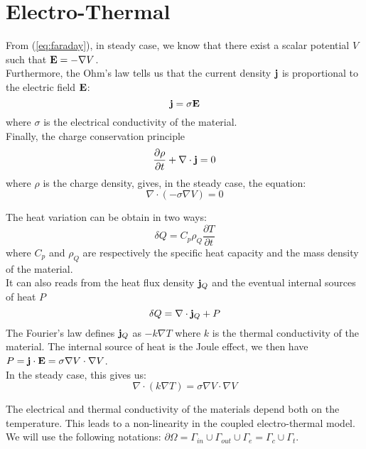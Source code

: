 \section{Electro-Thermal}
From (\ref{eq:faraday}), in steady case, we know that there exist a scalar
potential $V$ such that $\mathbf{E} = -\nabla V$.\\
Furthermore, the Ohm's law tells us that the current density $\mathbf{j}$ is
proportional to the electric field $\mathbf{E}$:
\begin{equation*}
  \mathbf{j} = \sigma\mathbf{E}
\end{equation*}
where $\sigma$ is the electrical conductivity of the material.\\
Finally, the charge conservation principle
\begin{equation*}
  \frac{\partial\rho}{\partial t} + \nabla\cdot\mathbf{j} = 0
\end{equation*}
where $\rho$ is the charge density, gives, in the steady case, the equation:
\begin{equation}
  \nabla\cdot(-\sigma\nabla V) = 0
\end{equation}

The heat variation can be obtain in two ways:
\begin{equation*}
  \delta Q = C_p\rho_Q\frac{\partial T}{\partial t}
\end{equation*}
where $C_p$ and $\rho_Q$ are respectively the specific heat capacity and the
mass density of the material.\\
It can also reads from the heat flux density $\mathbf{j}_Q$ and the eventual internal
sources of heat $P$
\begin{equation*}
  \delta Q = \nabla\cdot\mathbf{j}_Q + P
\end{equation*}
The Fourier's law defines $\mathbf{j}_Q$ as $-k\nabla T$ where $k$ is the thermal
conductivity of the material. The internal source of heat is the Joule effect,
we then have $P=\mathbf{j}\cdot\mathbf{E}=\sigma\nabla V\cdot\nabla V$.\\
In the steady case, this gives us:
\begin{equation}
  \nabla\cdot(k\nabla T) = \sigma\nabla V\cdot\nabla V
\end{equation}

The electrical and thermal conductivity of the materials depend both on the
temperature. This leads to a non-linearity in the coupled electro-thermal model.
\\

We will use the following notations:
$\partial\Omega=\Gamma_{in}\cup\Gamma_{out}\cup\Gamma_e=\Gamma_c\cup\Gamma_t$.\\

